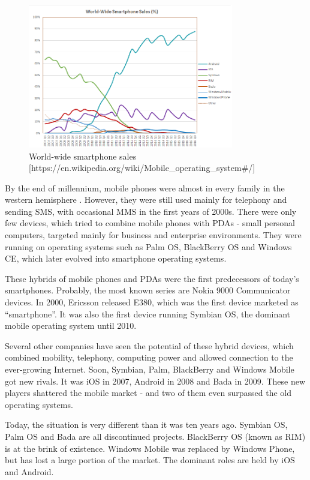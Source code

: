 \documentclass[english,master,public,dept460,male,cpdeclaration,oneside]{diploma}
\begin{document}
\begin{figure}[!ht]
\centering\includegraphics[width=0.8\textwidth]{Figures/World_Wide_Smartphone_Sales_Share.png}
\caption{World-wide smartphone sales [https://en.wikipedia.org/wiki/Mobile\_operating\_system\#/]}
\end{figure}

By the end of millennium, mobile phones were almost in every family in the western hemisphere \cite{worldBank}. However, they were still used mainly for telephony and sending SMS, with occasional MMS in the first years of 2000s. There were only few devices, which tried to combine mobile phones with PDAs - small personal computers, targeted mainly for business and enterprise environments. They were running on operating systems such as Palm OS, BlackBerry OS and Windows CE, which later evolved into smartphone operating systems.

These hybrids of mobile phones and PDAs were the first predecessors of today’s smartphones. Probably, the most known series are Nokia 9000 Communicator devices. In 2000, Ericsson released E380, which was the first device marketed as “smartphone”. It was also the first device running Symbian OS, the dominant mobile operating system until 2010.

Several other companies have seen the potential of these hybrid devices, which combined mobility, telephony, computing power and allowed connection to the ever-growing Internet. Soon, Symbian, Palm, BlackBerry and Windows Mobile got new rivals. It was iOS in 2007, Android in 2008 and Bada in 2009. These new players shattered the mobile market - and two of them even surpassed the old operating systems. 

Today, the situation is very different than it was ten years ago. Symbian OS, Palm OS and Bada are all discontinued projects. BlackBerry OS (known as RIM) is at the brink of existence. Windows Mobile was replaced by Windows Phone, but has lost a large portion of the market. The dominant roles are held by iOS and Android.
\end{document}
